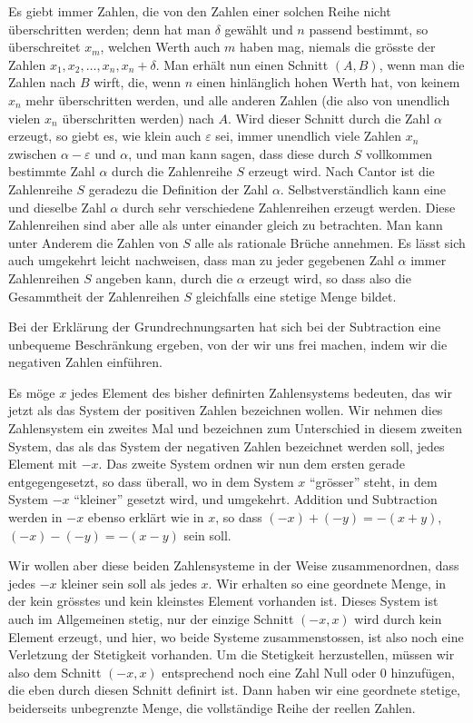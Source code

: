 \documentclass[11pt]{article}
\begin{document}
Es giebt immer Zahlen, die von den Zahlen einer solchen Reihe nicht überschritten werden; denn hat man $\delta$ gewählt und $n$ passend bestimmt, so überschreitet $x_m$, welchen Werth auch $m$ haben mag, niemals die grösste der Zahlen $x_1,x_2,\ldots,x_n,x_n+
\delta$. Man erhält nun einen Schnitt $(A,B)$, wenn man die Zahlen nach $B$ wirft, die, wenn $n$ einen hinlänglich hohen Werth hat, von keinem $x_n$ mehr überschritten werden, und alle anderen Zahlen (die also von unendlich vielen $x_n$ überschritten werden) nach $A$. Wird dieser Schnitt durch die Zahl $\alpha$ erzeugt, so giebt es, wie klein auch $\varepsilon$ sei, immer unendlich viele Zahlen $x_n$ zwischen $\alpha-\varepsilon$ und $\alpha$, und man kann sagen, dass diese durch $S$ vollkommen bestimmte Zahl $\alpha$ durch die Zahlenreihe $S$ erzeugt wird. Nach Cantor ist die Zahlenreihe $S$ geradezu die Definition der Zahl $\alpha$. Selbstverständlich kann eine und dieselbe Zahl $\alpha$ durch sehr verschiedene Zahlenreihen erzeugt werden. Diese Zahlenreihen sind aber alle als unter einander gleich zu betrachten. Man kann unter Anderem die Zahlen von $S$ alle als rationale Brüche annehmen. Es lässt sich auch umgekehrt leicht nachweisen, dass man zu jeder gegebenen Zahl $\alpha$ immer Zahlenreihen $S$ angeben kann, durch die $\alpha$ erzeugt wird, so dass also die Gesammtheit der Zahlenreihen $S$ gleichfalls eine stetige Menge bildet.

Bei der Erklärung der Grundrechnungsarten hat sich bei der Subtraction eine unbequeme Beschränkung ergeben, von der wir uns frei machen, indem wir die negativen Zahlen einführen.

Es möge $x$ jedes Element des bisher definirten Zahlensystems bedeuten, das wir jetzt als das System der positiven Zahlen bezeichnen wollen. Wir nehmen dies Zahlensystem ein zweites Mal und bezeichnen zum Unterschied in diesem zweiten System, das als das System der negativen Zahlen bezeichnet werden soll, jedes Element mit $-x$. Das zweite System ordnen wir nun dem ersten gerade entgegengesetzt, so dass überall, wo in dem System $x$ ``grösser'' steht, in dem System $-x$ ``kleiner'' gesetzt wird, und umgekehrt. Addition und Subtraction werden in $-x$ ebenso erklärt wie in $x$, so dass $(-x)+(-y)=-(x+y)$, $(-x)-(-y)=-(x-y)$ sein soll.

Wir wollen aber diese beiden Zahlensysteme in der Weise zusammenordnen, dass jedes $-x$ kleiner sein soll als jedes $x$. Wir erhalten so eine geordnete Menge, in der kein grösstes und kein kleinstes Element vorhanden ist. Dieses System ist auch im Allgemeinen stetig, nur der einzige Schnitt $(-x,x)$ wird durch kein Element erzeugt, und hier, wo beide Systeme zusammenstossen, ist also noch eine Verletzung der Stetigkeit vorhanden. Um die Stetigkeit herzustellen, müssen wir also dem Schnitt $(-x,x)$ entsprechend noch eine Zahl Null oder $0$ hinzufügen, die eben durch diesen Schnitt definirt ist. Dann haben wir eine geordnete stetige, beiderseits unbegrenzte Menge, die vollständige Reihe der reellen Zahlen.
\end{document}
